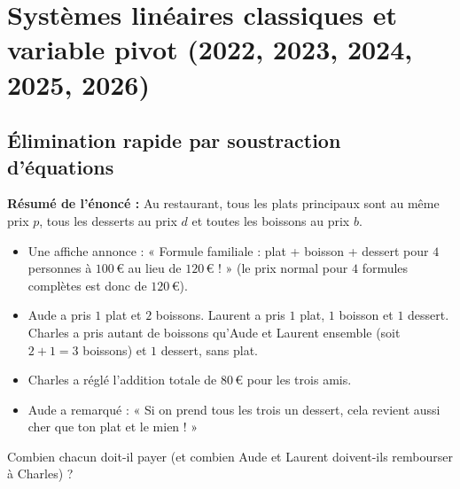 \section{Systèmes linéaires classiques et variable pivot (2022, 2023, 2024, 2025, 2026)}

\subsection{Élimination rapide par soustraction d'équations}

\begin{exemple}
\textbf{Résumé de l'énoncé :} Au restaurant, tous les plats principaux sont au même prix $p$, tous les desserts au prix $d$ et toutes les boissons au prix $b$.
\begin{itemize}
    \item Une affiche annonce : « Formule familiale : plat + boisson + dessert pour $4$ personnes à $100$\,€ au lieu de $120$\,€ ! » (le prix normal pour $4$ formules complètes est donc de $120$\,€).
    \item Aude a pris $1$ plat et $2$ boissons. Laurent a pris $1$ plat, $1$ boisson et $1$ dessert. Charles a pris autant de boissons qu'Aude et Laurent ensemble (soit $2 + 1 = 3$ boissons) et $1$ dessert, sans plat.
    \item Charles a réglé l'addition totale de $80$\,€ pour les trois amis.
    \item Aude a remarqué : « Si on prend tous les trois un dessert, cela revient aussi cher que ton plat et le mien ! »
\end{itemize}
Combien chacun doit-il payer (et combien Aude et Laurent doivent-ils rembourser à Charles) ?


\end{exemple}
